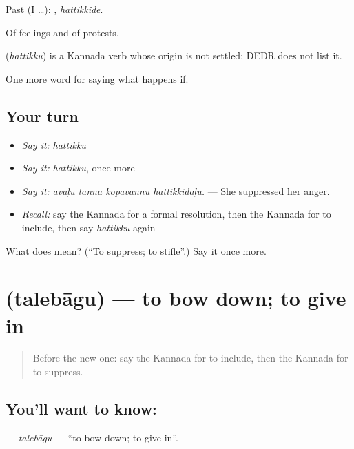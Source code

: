 Past (I …): , \emph{hattikkide}.

Of feelings and of protests.

\begin{cousinweb}
\textbf{} (\emph{hattikku}) is a Kannada verb whose origin is not settled: DEDR does not list it.
\end{cousinweb}

\begin{grammarlens}[title={What you've built}]
One more word for saying what happens if.
\end{grammarlens}

\subsection*{Your turn}
\begin{itemize}
\raggedright
  \item \emph{Say it:} \emph{hattikku}
  \item \emph{Say it:} \emph{hattikku}, once more
  \item \emph{Say it:} \emph{avaḷu tanna kōpavannu hattikkidaḷu.} — She suppressed her anger.
  \item \emph{Recall:} say the Kannada for a formal resolution, then the Kannada for to include, then say \emph{hattikku} again
\end{itemize}

\begin{tcolorbox}[breakable,colback=teal!4,colframe=teal!35!black,title={Before you move on}]
What does  mean? (\textquotedblleft{}To suppress; to stifle\textquotedblright{}.) Say it once more.
\end{tcolorbox}
\section[\texorpdfstring{\kn{ತಲೆಬಾಗು} (talebāgu)}{ತಲೆಬಾಗು (talebāgu)}]{ (talebāgu) — to bow down; to give in}

\label{lesson:KA-C432-talebagu}



\begin{quote}
Before the new one: say the Kannada for to include, then the Kannada for to suppress.
\end{quote}

\subsection*{You'll want to know: }
\textbf{} — \emph{talebāgu} — \textquotedblleft{}to bow down; to give in\textquotedblright{}.

